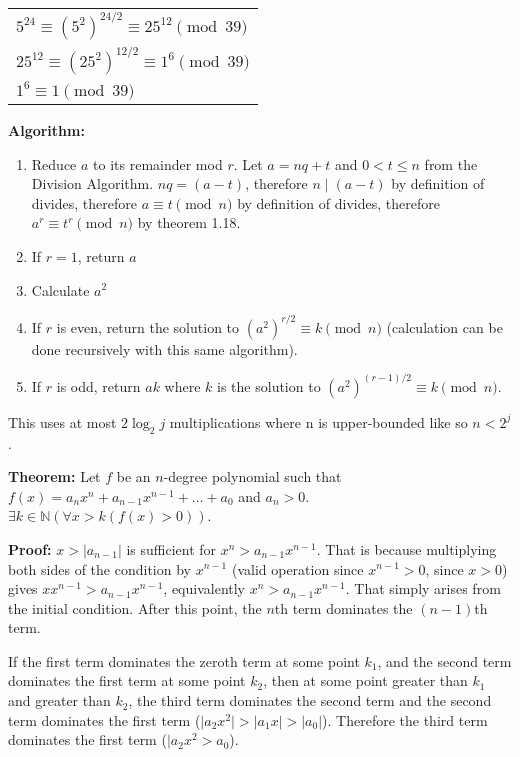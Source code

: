 \begin{tabular}[t]{l}
$ 5^{24} \equiv (5^2)^{24/2} \equiv 25^{12} \pmod{39} $ \\
$ 25^{12} \equiv (25^2)^{12/2} \equiv 1^{6} \pmod{39} $ \\
$ 1^{6} \equiv 1 \pmod{39} $ \\
\end{tabular}

\item \textbf{Algorithm:}

\begin{enumerate}
\item Reduce \(a\) to its remainder mod \(r\). Let \(a = nq + t\) and \(0 < t \leq n\) from the Division Algorithm. \(nq = (a - t)\), therefore \(n \mid (a-t)\) by definition of divides, therefore \(a \equiv t \pmod{n}\) by definition of divides, therefore \(a^r \equiv t^r \pmod{n}\) by theorem 1.18.
\item If \(r = 1\), return \(a\)
\item Calculate \(a^2\)
\item If \(r\) is even, return the solution to \((a^2)^{r/2} \equiv k \pmod{n}\) (calculation can be done recursively with this same algorithm).
\item If \(r\) is odd, return \(ak\) where \(k\) is the solution to \((a^2)^{(r-1)/2} \equiv k \pmod{n}\).
\end{enumerate}

This uses at most \(2 \log_2 j\) multiplications where n is upper-bounded like so \(n < 2^j\).

\setcounter{enumii}{10}
\item \textbf{Theorem:} Let \(f\) be an \(n\)-degree polynomial such that \(f(x) = a_n x^n + a_{n-1} x^{n-1} + \dots + a_0 \) and \(a_n > 0\). \(\exists k \in \mathbb N (\forall x > k (f(x) > 0))\).

\textbf{Proof:} \(x > \lvert a_{n-1} \rvert\) is sufficient for \(x^n > a_{n-1} x^{n-1}\). That is because multiplying both sides of the condition by \(x^{n-1}\) (valid operation since \(x^{n-1}>0\), since \(x>0\)) gives \(x x^{n-1} > a_{n-1} x^{n-1}\), equivalently \(x^n  > a_{n-1} x^{n-1}\). That simply arises from the initial condition. After this point, the \(n\)th term dominates the \((n-1)\)th term.

If the first term dominates the zeroth term at some point \(k_1\), and the second term dominates the first term at some point \(k_2\), then at some point greater than \(k_1\) and greater than \(k_2\), the third term dominates the second term and the second term dominates the first term (\(\lvert a_2 x^2 \rvert > \lvert a_1 x \rvert > \lvert a_0 \rvert\)). Therefore the third term dominates the first term (\(\lvert a_2 x^2 > a_0\)). 

